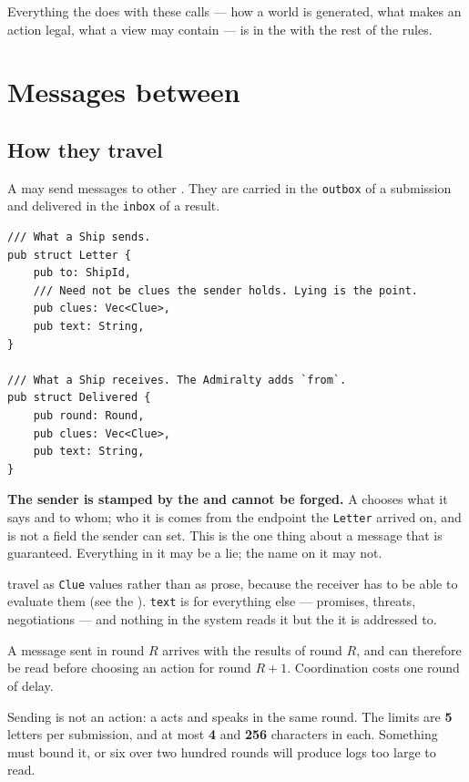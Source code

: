 \documentclass{article}
\begin{document}
Everything the \chart{} does with these calls --- how a world is generated, what makes an action
legal, what a view may contain --- is in the \MD{} with the rest of the rules.

\newpage
\section{Messages between \ships}
\label{proto:mail}

\subsection{How they travel}

A \ship{} may send messages to other \ships. They are carried in the \texttt{outbox} of a
submission and delivered in the \texttt{inbox} of a result.

\begin{lstlisting}
/// What a Ship sends.
pub struct Letter {
    pub to: ShipId,
    /// Need not be clues the sender holds. Lying is the point.
    pub clues: Vec<Clue>,
    pub text: String,
}

/// What a Ship receives. The Admiralty adds `from`.
pub struct Delivered {
    pub round: Round,
    pub clues: Vec<Clue>,
    pub text: String,
}
\end{lstlisting}

\textbf{The sender is stamped by the \admiralty{} and cannot be forged.} A \ship{} chooses what it
says and to whom; who it is comes from the endpoint the \texttt{Letter} arrived on, and is not a
field the sender can set. This is the one thing about a message that is guaranteed. Everything in
it may be a lie; the name on it may not.

\clues{} travel as \texttt{Clue} values rather than as prose, because the receiver has to be able to
evaluate them (see the \MD). \texttt{text} is for everything else --- promises, threats,
negotiations --- and nothing in the system reads it but the \ship{} it is addressed to.

A message sent in round $R$ arrives with the results of round $R$, and can therefore be read before
choosing an action for round $R+1$. Coordination costs one round of delay.

Sending is not an action: a \ship{} acts and speaks in the same round. The limits are \textbf{5}
letters per submission, and at most \textbf{4} \clues{} and \textbf{256} characters in each.
Something must bound it, or six \ships over two hundred rounds will produce logs too large to
read.
\end{document}
